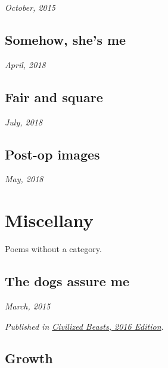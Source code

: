 \documentclass[10pt]{memoir}
\begin{document}
  \hfill\textit{October, 2015}

  
  \newpage


  \section{Somehow, she's me}

  \hfill\textit{April, 2018}

  
  \newpage


  \section{Fair and square}

  \hfill\textit{July, 2018}

  
  \newpage


  \section{Post-op images}

  \hfill\textit{May, 2018}
  \newpage

  
  \newpage


  \chapter{Miscellany}

  Poems without a category.
  \thispagestyle{empty}
  \newpage


  \section{The dogs assure me}

  \hfill\textit{March, 2015}

  

  \textit{Published in \underline{Civilized Beasts, 2016 Edition}.}
  \cleartoverso


  \section{Growth}
\end{document}
